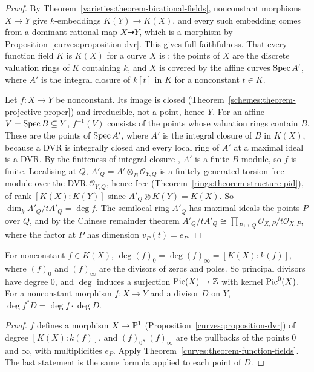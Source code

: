 \begin{proof}
By Theorem~\ref{varieties:theorem-birational-fields}, nonconstant morphisms $X \to Y$ give $k$-embeddings $K(Y) \to K(X)$, and every such embedding comes from a
dominant rational map $X \dashrightarrow Y$, which is a morphism by Proposition~\ref{curves:proposition-dvr}. This gives full faithfulness. That every function field $K$ is
$K(X)$ for a curve $X$ is \cite[Theorem I.6.9]{hartshorne-ag}: the points of $X$ are the discrete valuation rings of $K$ containing $k$, and $X$ is covered by the affine curves
$\operatorname{Spec} A'$, where $A'$ is the integral closure of $k[t]$ in $K$ for a nonconstant $t \in K$.

Let $f \colon X \to Y$ be nonconstant. Its image is closed (Theorem~\ref{schemes:theorem-projective-proper}) and irreducible, not a point, hence $Y$. For an affine
$V = \operatorname{Spec} B \subseteq Y$, $f^{-1}(V)$ consists of the points whose valuation rings contain $B$. These are the points of $\operatorname{Spec} A'$, where $A'$ is the integral closure of $B$
in $K(X)$, because a DVR is integrally closed and every local ring of $A'$ at a maximal ideal is a DVR. By the finiteness of integral closure \cite[Theorem I.3.9A]{hartshorne-ag},
$A'$ is a finite $B$-module, so $f$ is finite. Localising at $Q$, $A'_Q = A' \otimes_B\mathcal{O}_{Y,Q}$ is a finitely generated torsion-free module over the DVR
$\mathcal{O}_{Y,Q}$, hence free (Theorem~\ref{rings:theorem-structure-pid}), of rank $[K(X) : K(Y)]$ since $A'_Q \otimes K(Y) = K(X)$. So
$\dim_kA'_Q/tA'_Q = \deg f$. The semilocal ring $A'_Q$ has maximal ideals the points $P$ over $Q$, and by the Chinese remainder theorem
$A'_Q/tA'_Q \cong \prod_{P \mapsto Q}\mathcal{O}_{X,P}/t\mathcal{O}_{X,P}$, where the factor at $P$ has dimension $v_P(t) = e_P$.
\end{proof}

\begin{corollary}\label{curves:corollary-degree-principal}
For nonconstant $f \in K(X)$, $\deg(f)_0 = \deg(f)_\infty = [K(X) : k(f)]$, where $(f)_0$ and $(f)_\infty$ are the divisors of zeros and poles. So principal divisors have
degree $0$, and $\deg$ induces a surjection $\operatorname{Pic}(X) \to \mathbb{Z}$ with kernel $\operatorname{Pic}^0(X)$. For a nonconstant morphism $f \colon X \to Y$ and a divisor $D$ on $Y$,
$\deg f^*D = \deg f \cdot \deg D$.
\end{corollary}

\begin{proof}
$f$ defines a morphism $X \to \mathbb{P}^1$ (Proposition~\ref{curves:proposition-dvr}) of degree $[K(X) : k(f)]$, and $(f)_0$, $(f)_\infty$ are the pullbacks of the points $0$ and
$\infty$, with multiplicities $e_P$. Apply Theorem~\ref{curves:theorem-function-fields}. The last statement is the same formula applied to each point of $D$.
\end{proof}


